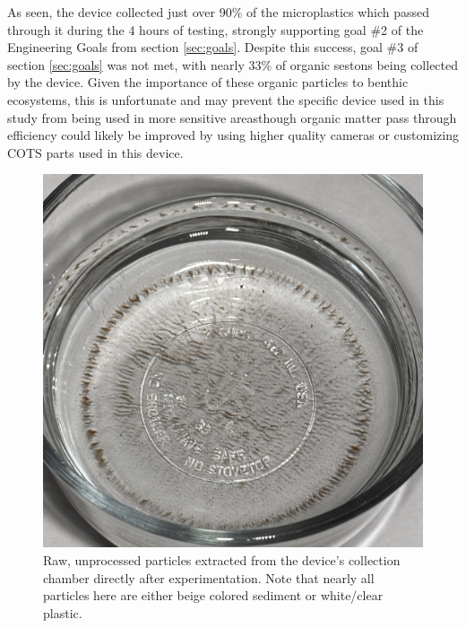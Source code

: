 \documentclass[fleqn,10pt]{SelfArx} %
\begin{document}
	As seen, the device collected just over 90\% of the microplastics which passed through it during the 4 hours of testing, strongly supporting goal \#2 of the Engineering Goals from section \ref{sec:goals}. Despite this success, goal \#3 of section \ref{sec:goals} was not met, with nearly 33\% of organic sestons being collected by the device. Given the importance of these organic particles to benthic ecosystems, this is unfortunate and may prevent the specific device used in this study from being used in more sensitive areas\textemdash though organic matter pass through efficiency could likely be improved by using higher quality cameras or customizing COTS parts used in this device.
	
	\begin{figure}[h]
		\centering
		\includegraphics[width=1\linewidth]{Figures/RawSeparated}
		\caption[Raw Separated Plastics]{Raw, unprocessed particles extracted from the device's collection chamber directly after experimentation. Note that nearly all particles here are either beige colored sediment or white/clear plastic.}
		\label{fig:rawseparated}
	\end{figure}
	
\end{document}
